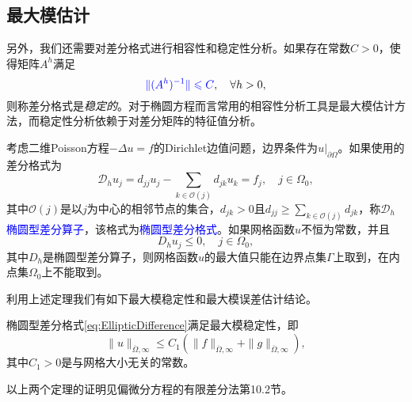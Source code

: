 \documentclass[a4paper,10pt]{ctexart}
\begin{document}
\subsection{最大模估计}
另外，我们还需要对差分格式进行相容性和稳定性分析。如果存在常数$ C>0 $，使得矩阵$ A^h $满足
\begin{equation}
    \textcolor{blue}{\| (A^h)^{-1} \| \leqslant C},\quad \forall h>0,
\end{equation}
则称差分格式是\emph{稳定的}。对于椭圆方程而言常用的相容性分析工具是最大模估计方法，而稳定性分析依赖于对差分矩阵的特征值分析。
\begin{theorem}
    考虑二维Poisson方程$ -\Delta u = f $的Dirichlet边值问题，边界条件为$ u|_{\partial \Omega} $。如果使用的差分格式为
    \begin{equation}\label{eq:EllipticDifference}
        \mathcal{D}_h u_j = d_{jj} u_j - \sum_{k\in \mathcal{O}(j)}d_{jk}u_k = f_j,\quad j\in \Omega_0,
    \end{equation}
    其中$ \mathcal{O}(j) $是以$ j $为中心的相邻节点的集合，$ d_{jk}>0 $且$ d_{jj} \geqslant \sum_{k\in \mathcal{O}(j)}d_{jk} $，称$ \mathcal{D}_h $\textcolor{blue}{椭圆型差分算子}，该格式为\textcolor{blue}{椭圆型差分格式}。如果网格函数$ u $不恒为常数，并且
    \begin{equation}
        D_h u_j \leqslant 0,\quad j\in \Omega_0,
    \end{equation}
    其中$ D_h $是椭圆型差分算子，则网格函数$ u $的最大值只能在边界点集$ \Gamma $上取到，在内点集$ \Omega_0 $上不能取到。
\end{theorem}
利用上述定理我们有如下最大模稳定性和最大模误差估计结论。
\begin{theorem}\label{th:MaxModulusStability}
    椭圆型差分格式\eqref{eq:EllipticDifference}满足最大模稳定性，即
    \begin{equation}
        \| u \|_{\overline{\Omega},\infty} \leqslant C_1 (\| f \|_{\overline{\Omega},\infty} + \| g \|_{\overline{\Omega},\infty} ),
    \end{equation}
    其中$ C_1>0 $是与网格大小无关的常数。
\end{theorem}
以上两个定理的证明见偏微分方程的有限差分法第10.2节。
\end{document}
